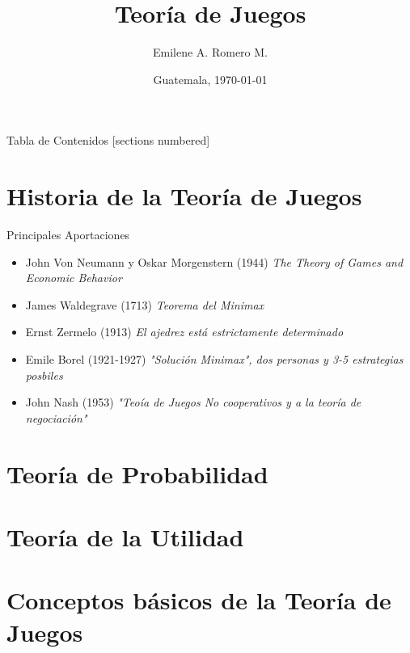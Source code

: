\documentclass[10pt]{beamer}
\title{Teoría de Juegos}
\subtitle{}
\date{Guatemala, \today}
\author{Emilene A. Romero M.}
\institute{Universidad de San Carlos de Guatemala}
\begin{document}
\maketitle

\begin{frame}{Tabla de Contenidos}
  [sections numbered]
  \tableofcontents[hideallsubsections]
\end{frame}

\section{Historia de la Teoría de Juegos}

\begin{frame}[fragile]{Principales Aportaciones}
	\begin{itemize}
		\item John Von Neumann y Oskar Morgenstern (1944) \textit{The Theory of Games and Economic Behavior}
		\item James Waldegrave (1713) \textit{Teorema del Minimax}
		\item Ernst Zermelo (1913) \textit{El ajedrez está estrictamente determinado}
		\item Emile Borel (1921-1927) \textit{"Solución Minimax", dos personas y 3-5 estrategias posbiles}
		\item John Nash (1953) \textit{"Teoía de Juegos No cooperativos y a la teoría de negociación"}
		
	\end{itemize}
\end{frame}

\section{Teoría de Probabilidad}

\section{Teoría de la Utilidad}

\section{Conceptos básicos de la Teoría de Juegos}
\end{document}

